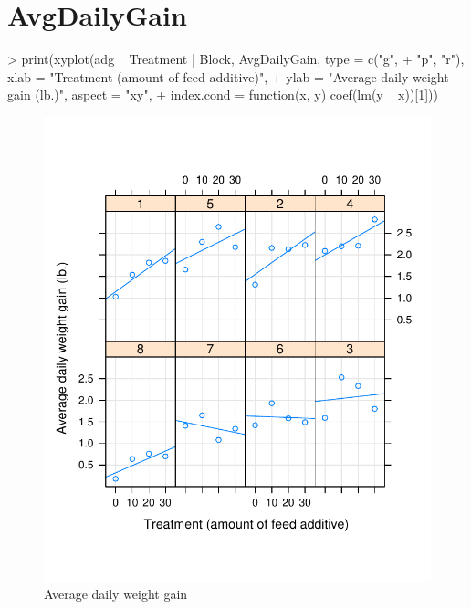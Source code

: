 \documentclass[12pt]{article}
\begin{document}

\appendix

\section{AvgDailyGain}
\label{sec:AvgDailyGain}

\begin{Schunk}
\begin{Sinput}
> print(xyplot(adg ~ Treatment | Block, AvgDailyGain, type = c("g", 
+     "p", "r"), xlab = "Treatment (amount of feed additive)", 
+     ylab = "Average daily weight gain (lb.)", aspect = "xy", 
+     index.cond = function(x, y) coef(lm(y ~ x))[1]))
\end{Sinput}
\end{Schunk}
\begin{figure}[tbp]
  \centering
  \includegraphics{figs/f-adg1}
  \caption{Average daily weight gain}
  \label{fig:adg1}
\end{figure}
\end{document}
